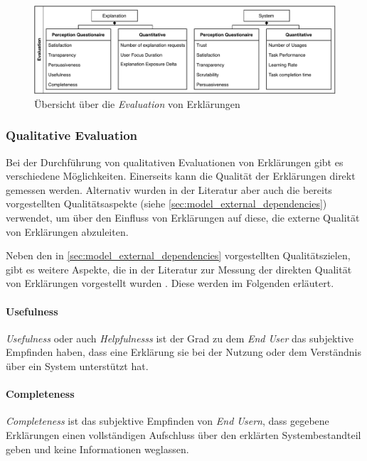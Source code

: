 \begin{figure}[htb!]
    \begin{center}
        \includegraphics[width=\textwidth]{contents/05_model_description/res/model_evaluation_overview.pdf}
    \end{center}
    \caption{Übersicht über die \textit{Evaluation} von Erklärungen}
    \label{fig:model_evaluation_overview}
\end{figure}

\subsubsection{Qualitative Evaluation}

Bei der Durchführung von qualitativen Evaluationen von Erklärungen gibt es verschiedene Möglichkeiten. Einerseits kann die Qualität der Erklärungen direkt gemessen werden. Alternativ wurden in der Literatur aber auch die bereits vorgestellten Qualitätsaspekte (siehe \autoref{sec:model_external_dependencies}) verwendet, um über den Einfluss von Erklärungen auf diese, die externe Qualität von Erklärungen abzuleiten.

Neben den in \autoref{sec:model_external_dependencies} vorgestellten Qualitätszielen, gibt es weitere Aspekte, die in der Literatur zur Messung der direkten Qualität von Erklärungen vorgestellt wurden \cite{sato_action-triggering_2019}. Diese werden im Folgenden erläutert.

\paragraph{Usefulness} \textit{Usefulness} oder auch \textit{Helpfulnesss} ist der Grad zu dem \textit{End User} das subjektive Empfinden haben, dass eine Erklärung sie bei der Nutzung oder dem Verständnis über ein System unterstützt hat. 

\paragraph{Completeness} \textit{Completeness} ist das subjektive Empfinden von \textit{End Usern}, dass gegebene Erklärungen einen vollständigen Aufschluss über den erklärten Systembestandteil geben und keine Informationen weglassen.

